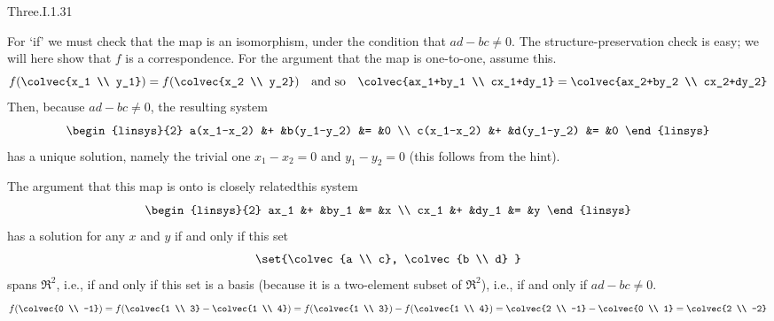 \begin{ans}{Three.I.1.31}
\begin{exparts}
          For `if' we must check that the map is an isomorphism,
          under the condition that $ad-bc\neq 0$.
          The structure-preservation check is easy; we will here show that
          \( f \) is a correspondence.
          For the argument that the map is one-to-one, assume this.
          \begin{equation*}
            f(\colvec{x_1 \\ y_1})
            =f(\colvec{x_2 \\ y_2})
            \quad\text{and so}\quad
            \colvec{ax_1+by_1 \\ cx_1+dy_1}
            =\colvec{ax_2+by_2 \\ cx_2+dy_2}
          \end{equation*}
          Then, because \( ad-bc\neq 0 \), the resulting system
          \begin{equation*}
            \begin{linsys}{2}
              a(x_1-x_2)  &+  &b(y_1-y_2)  &=  &0  \\
              c(x_1-x_2)  &+  &d(y_1-y_2)  &=  &0
            \end{linsys}
          \end{equation*}
          has a unique solution, namely the trivial one
          $x_1-x_2=0$ and $y_1-y_2=0$
          (this follows from the hint).

          The argument that this map is onto is closely related\Dash this system
          \begin{equation*}
            \begin{linsys}{2}
              ax_1  &+  &by_1  &=  &x  \\
              cx_1  &+  &dy_1  &=  &y
            \end{linsys}
          \end{equation*}
          has a solution for any \( x \) and \( y \) if and only if
          this set
          \begin{equation*}
            \set{\colvec{a \\ c},
                 \colvec{b \\ d} }
          \end{equation*}
          spans \( \Re^2 \), i.e., if and only if this set is
          a basis (because it is a two-element subset of $\Re^2$),
          i.e., if and only if \( ad-bc\neq 0 \).
        \partsitem
          \begin{equation*}
            f(\colvec{0 \\ -1})=f(\colvec{1 \\ 3}-\colvec{1 \\ 4})
            =f(\colvec{1 \\ 3})-f(\colvec{1 \\ 4})
            =\colvec{2 \\ -1}-\colvec{0 \\ 1}
            =\colvec{2 \\ -2}
          \end{equation*}
      \end{exparts}
    
\end{ans}

